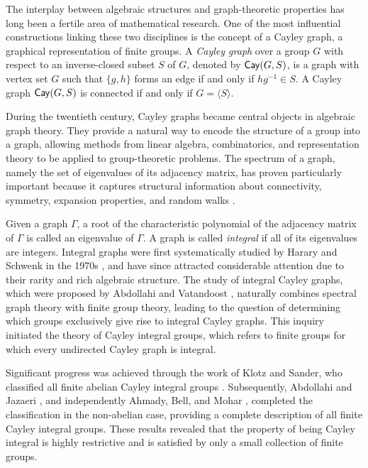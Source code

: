 \documentclass{amsart}
\def\Cay{{\sf Cay}} \def\Ker{{\sf Ker}}
\begin{document}
The interplay between algebraic structures and graph-theoretic properties has long been a fertile area of mathematical research. One of the most influential constructions linking these two disciplines is the concept of a Cayley graph, a graphical representation of finite groups. A \textit{Cayley graph} over a group \( G \) with respect to an inverse-closed subset \( S \) of \( G \), denoted by \( \Cay(G, S) \), is a graph with vertex set \( G \) such that $\{g,h\}$ forms an edge if and only if \( hg^{-1} \in S \). A Cayley graph $\Cay(G,S)$ is connected if and only if $G=\langle S\rangle$.

During the twentieth century, Cayley graphs became central objects in algebraic graph theory. They provide a natural way to encode the structure of a group into a graph, allowing methods from linear algebra, combinatorics, and representation theory to be applied to group-theoretic problems. The spectrum of a graph, namely the set of eigenvalues of its adjacency matrix, has proven particularly important because it captures structural information about connectivity, symmetry, expansion properties, and random walks \cite{LZ}.

Given a graph $\Gamma$, a root of  the characteristic polynomial of the adjacency matrix of $\Gamma$ is called an eigenvalue of $\Gamma$.  A graph is called \textit{integral} if all of its eigenvalues are integers. Integral graphs were first systematically studied by Harary and Schwenk in the 1970s \cite{HS}, and have since attracted considerable attention due to their rarity and rich algebraic structure. The study of integral Cayley graphs, which were proposed by Abdollahi and Vatandoost \cite{AV},  naturally combines spectral graph theory with finite group theory, leading to the question of determining which groups exclusively give rise to integral Cayley graphs. This inquiry initiated the theory of Cayley integral groups, which refers to finite groups for which every undirected Cayley graph is integral.

Significant progress was achieved through the work of Klotz and Sander, who classified all finite abelian Cayley integral groups \cite{KS}. Subsequently, Abdollahi and Jazaeri \cite{AJ}, and independently Ahmady, Bell, and Mohar \cite{Azhvan}, completed the classification in the non-abelian case, providing a complete description of all finite Cayley integral groups. These results revealed that the property of being Cayley integral is highly restrictive and is satisfied by only a small collection of finite groups.
\end{document}
